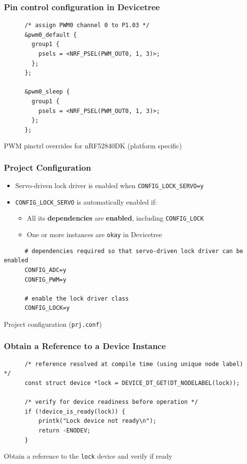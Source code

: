 \documentclass[handout]{beamer}
\begin{document}
\begin{frame}[fragile]
  \frametitle{Pin control configuration in Devicetree}

  \begin{listing}[H]
    \begin{verbatim}
      /* assign PWM0 channel 0 to P1.03 */
      &pwm0_default {
        group1 {
          psels = <NRF_PSEL(PWM_OUT0, 1, 3)>;
        };
      };

      &pwm0_sleep {
        group1 {
          psels = <NRF_PSEL(PWM_OUT0, 1, 3)>;
        };
      };
    \end{verbatim}
    \caption{PWM pinctrl overrides for nRF52840DK (platform specific)}
  \end{listing}
\end{frame}

\begin{frame}[fragile]
  \frametitle{Project Configuration}

  \begin{itemize}
    \item Servo-driven lock driver is enabled when
          \texttt{CONFIG\_LOCK\_SERVO=y}
    \item \texttt{CONFIG\_LOCK\_SERVO} is automatically enabled if:
          \begin{itemize}
            \item All its \textbf{dependencies} are \textbf{enabled}, including
                  \texttt{CONFIG\_LOCK}
            \item One or more instances are \texttt{okay} in Devicetree
          \end{itemize}
  \end{itemize}
  \begin{listing}[H]
    \begin{verbatim}
      # dependencies required so that servo-driven lock driver can be enabled
      CONFIG_ADC=y
      CONFIG_PWM=y

      # enable the lock driver class
      CONFIG_LOCK=y
    \end{verbatim}
    \caption{Project configuration (\texttt{prj.conf})}
  \end{listing}
\end{frame}

\begin{frame}[fragile]
  \frametitle{Obtain a Reference to a Device Instance}

  \begin{listing}[H]
    \begin{verbatim}
      /* reference resolved at compile time (using unique node label) */
      const struct device *lock = DEVICE_DT_GET(DT_NODELABEL(lock));

      /* verify for device readiness before operation */
      if (!device_is_ready(lock)) {
          printk("Lock device not ready\n");
          return -ENODEV;
      }
    \end{verbatim}
    \caption{Obtain a reference to the \texttt{lock} device and verify if ready}
  \end{listing}
\end{frame}
\end{document}
